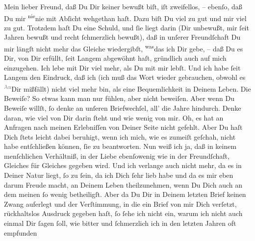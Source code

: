 \pstart
           Mein lieber Freund, daß Du Dir keiner \label{K_L03194-1v}\label{K_L03194-1h} bewußt biſt, iſt zweifellos, – ebenſo, daß Du mir \substVorne{}\textsuperscript{nie}\substDazwischen{}nie\substHinten{} mit Abſicht wehgethan haſt. Dazu biſt Du viel zu gut und mir viel zu gut.
                   Trotzdem haſt Du eine Schuld, und ſie liegt darin (Dir unbewußt, mir ſeit
               Jahren bewußt und recht ſchmerzlich bewußt), daß in unſerer Freundſchaft Du mir
               längſt nicht mehr das Gleiche wiedergibſt, \substVorne{}\textsuperscript{was}\substDazwischen{}das\substHinten{} ich Dir gebe, – daß Du  es Dir, von Dir erfüllt, ſeit Langem abgewöhnt haſt, \strikeout{\textcolor{gray}{a}} gründlich auch auf mich einzugehen. Ich lebe mit Dir viel mehr, als Du
               mit mir lebſt. Und ich habe ſeit Langem den Eindruck, daß ich (ich muß das Wort
               wieder gebrauchen,  obwohl es \substVorne{}\textsuperscript{\textcolor{gray}{An}}\substDazwischen{}Dir\substHinten{} mißfällt) nicht viel mehr bin, als eine Bequemlichkeit in Deinem
               Leben. Die Beweiſe? So etwas kann man nur fühlen, aber nicht beweiſen. Aber wenn Du
               Beweiſe willſt, ſo denke an unſeren Briefwechſel, all’ die Jahre hindurch. Denke {\pb}daran, wie viel von Dir darin ſteht und wie wenig
               von mir. Oh, es hat an Anfragen nach meinen Erlebniſſen von Deiner Seite nicht
               gefehlt. Aber Du haſt Dich ſtets leicht dabei beruhigt, wenn ich mich, wie es zumeiſt
               geſchah, nicht habe entſchließen können, ſie zu beantworten. Nun weiß ich ja, daß in
               keinem menſchlichen Verhältniß, in der Liebe ebenſowenig wie in der Freundſchaft,
               Gleiches für Gleiches gegeben wird. Und ich verlange auch nicht mehr, da es in Deiner
               Natur liegt, ſo zu ſein, da ich Dich ſehr lieb habe und da es mir eben darum Freude
               macht, an Deinem Leben theilzunehmen, wenn Du Dich auch an dem meinen ſo wenig
               betheiligſt. Aber da Du Dir in Deinem letzten Brief keinen Zwang auferlegt und der
               Verſtimmung, in die ein Brief von mir Dich verſetzt, rückhaltslos Ausdruck gegeben
               haſt, ſo ſehe ich nicht ein, warum ich nicht auch einmal Dir ſagen ſoll, wie bitter
               und ſchmerzlich \strikeout{\textcolor{gray}{h}} ich in den letzten Jahren oft  empfunden
